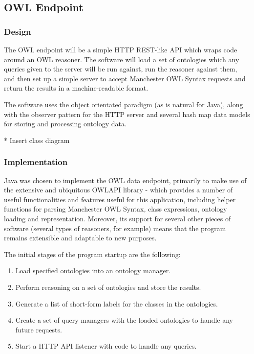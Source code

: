 \documentclass{article}
\begin{document}
\subsection{OWL Endpoint}

\subsubsection{Design}

The OWL endpoint will be a simple HTTP REST-like API which wraps code around an
OWL reasoner. The software will load a set of ontologies which any queries given
to the server will be run against, run the reasoner against them, and then set
up a simple server to accept Manchester OWL Syntax requests and return the
results in a machine-readable format.

The software uses the object orientated paradigm (as is natural for Java), along
with the observer pattern for the HTTP server and several hash map data models
for storing and processing ontology data.

* Insert class diagram

\subsubsection{Implementation}

Java was chosen to implement the OWL data endpoint, primarily to make use of the
extensive and ubiquitous OWLAPI library - which provides a number of useful
functionalities and features useful for this application, including helper
functions for parsing Manchester OWL Syntax, class expressions, ontology loading
and representation. Moreover, its support for several other pieces of software
(several types of reasoners, for example) means that the program remains
extensible and adaptable to new purposes.

The initial stages of the program startup are the following:

\begin{enumerate}
    \item Load specified ontologies into an ontology manager. 
    \item Perform reasoning on a set of ontologies and store the results.
    \item Generate a list of short-form labels for the classes in the
    ontologies.
    \item Create a set of query managers with the loaded ontologies to handle
    any future requests.
    \item Start a HTTP API listener with code to handle any queries.
\end{enumerate}
\end{document}
